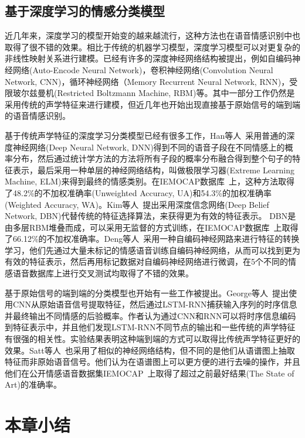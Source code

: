 \subsection{基于深度学习的情感分类模型}
\label{ssec:dnn_cls}

近几年来，深度学习的模型开始变的越来越流行，这种方法也在语音情感识别中也取得了很不错的效果。相比于传统的机器学习模型，深度学习模型可以对更复杂的非线性映射关系进行建模。已经有许多的深度神经网络结构被提出，例如自编码神经网络(Auto-Encode Neural Network)，卷积神经网络(Convolution Neural Network, CNN)，循环神经网络（Memory Recurrent Neural Network, RNN)，受限玻尔兹曼机(Restricted Boltzmann Machine, RBM)等。其中一部分工作仍然是采用传统的声学特征来进行建模，但近几年也开始出现直接基于原始信号的端到端的语音情感识别。

基于传统声学特征的深度学习分类模型已经有很多工作，Han等人~\cite{Han2014Speech}采用普通的深度神经网络(Deep Neural Network, DNN)得到不同的语音子段在不同情感上的概率分布，然后通过统计学方法的方法将所有子段的概率分布融合得到整个句子的特征表示，最后采用一种单层的神经网络结构，叫做极限学习器(Extreme Learning Machine, ELM)来得到最终的情感类别。在IEMOCAP数据库~\cite{Busso2008IEMOCAP}上，这种方法取得了48.2\%的不加权准确率(Unweighted Accuracy, UA)和54.3\%的加权准确率(Weighted Accuracy, WA)。Kim等人~\cite{Kim2013Deep}提出采用深度信念网络(Deep Belief Network, DBN)代替传统的特征选择算法，来获得更为有效的特征表示。 DBN是由多层RBM堆叠而成，可以采用无监督的方式训练，在IEMOCAP数据库~\cite{Busso2008IEMOCAP}上取得了66.12\%的不加权准确率。Deng等人~\cite{Deng2013Sparse}采用一种自编码神经网路来进行特征的转换学习，他们先通过大量未标记的情感语音训练自编码神经网络，从而可以找到更为有效的特征表示，然后再用标记数据对自编码神经网络进行微调，在5个不同的情感语音数据库上进行交叉测试均取得了不错的效果。

基于原始信号的端到端的分类模型也开始有一些工作被提出。George等人~\cite{Trigeorgis2016Adieu}提出使用CNN从原始语音信号提取特征，然后通过LSTM-RNN捕获输入序列的时序信息并最终输出不同情感的后验概率。作者认为通过CNN和RNN可以将时序信息编码到特征表示中，并且他们发现LSTM-RNN不同节点的输出和一些传统的声学特征有很强的相关性。实验结果表明这种端到端的方式可以取得比传统声学特征更好的效果。Satt等人~\cite{Satt2017Efficient}也采用了相似的神经网络结构，但不同的是他们从语谱图上抽取特征而非原始语音信号。他们认为在语谱图上可以更方便的进行去噪的操作，并且他们在公开情感语音数据集IEMOCAP~\cite{Busso2008IEMOCAP}上取得了超过之前最好结果(The State of Art)的准确率。

\section{本章小结}
\label{sec:basic_konwledge_summary}

